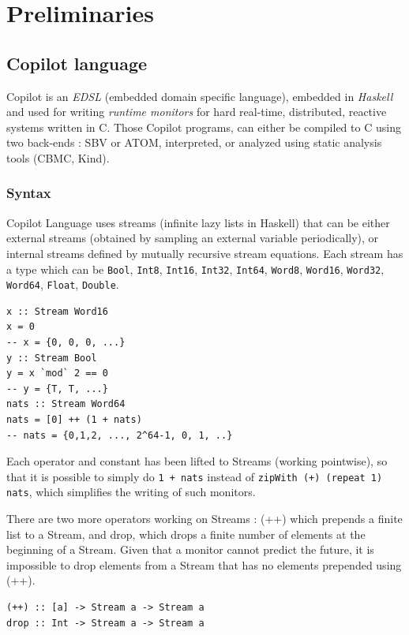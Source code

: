 \documentclass[a4paper,11pt,final]{article}
\begin{document}
	
	\cleardoublepage
	\section{Preliminaries}
	\subsection{Copilot language}
	Copilot is an \emph{EDSL} (embedded domain specific language), embedded in \emph{Haskell} and used for writing \emph{runtime monitors} for hard real-time, distributed, reactive systems written in C\cite{Copilot01}. Those Copilot programs, can either be compiled to C using two back-ends : SBV or ATOM, interpreted, or analyzed using static analysis tools (CBMC, Kind).
	
	\subsubsection{Syntax}
	Copilot Language uses streams (infinite lazy lists in Haskell) that can be either external streams (obtained by sampling an external variable periodically), or internal streams defined by mutually recursive stream equations. Each stream has a type which can be \texttt{Bool}, \texttt{Int8}, \texttt{Int16}, \texttt{Int32}, \texttt{Int64}, \texttt{Word8}, \texttt{Word16}, \texttt{Word32}, \texttt{Word64}, \texttt{Float}, \texttt{Double}.
	
\begin{verbatim}
x :: Stream Word16
x = 0
-- x = {0, 0, 0, ...}
y :: Stream Bool
y = x `mod` 2 == 0
-- y = {T, T, ...}
nats :: Stream Word64
nats = [0] ++ (1 + nats)
-- nats = {0,1,2, ..., 2^64-1, 0, 1, ..}  
\end{verbatim}
	
	Each operator and constant has been lifted to Streams (working pointwise), so that it is possible to simply do \texttt{1 + nats} instead of \texttt{zipWith (+) (repeat 1) nats}, which simplifies the writing of such monitors. 
	
	There are two more operators working on Streams : (++) which prepends a finite list to a Stream, and drop, which drops a finite number of elements at the beginning of a Stream. Given that a monitor cannot predict the future, it is impossible to drop elements from a Stream that has no elements prepended using (++).
	
\begin{verbatim}
(++) :: [a] -> Stream a -> Stream a
drop :: Int -> Stream a -> Stream a  
\end{verbatim}
	
\end{document}
